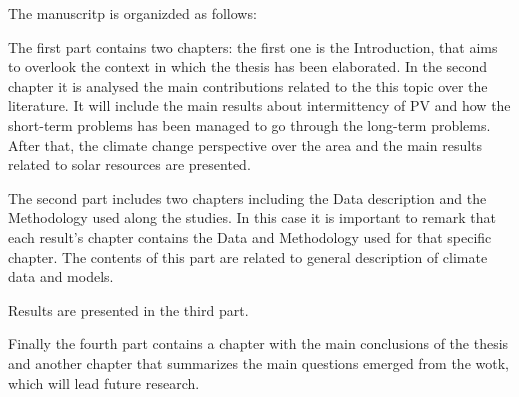 The manuscritp is organizded as follows:

The first part contains two chapters: the first one is the Introduction, that aims to overlook the context in which the thesis has been elaborated. In the second chapter it is analysed the main contributions related to the this topic over the literature. It will include the main results about intermittency of PV and how the short-term problems has been managed to go through the long-term problems. After that, the climate change perspective over the area and the main results related to solar resources are presented.

The second part includes two chapters including the Data description and the Methodology used along the studies. In this case it is important to remark that each result's chapter contains the Data and Methodology used for that specific chapter. The contents of this part are related to general description of climate data and models.

Results are presented in the third part.

Finally the fourth part contains a chapter with the main conclusions of the thesis and another chapter that summarizes the main questions emerged from the wotk, which will lead future research.



